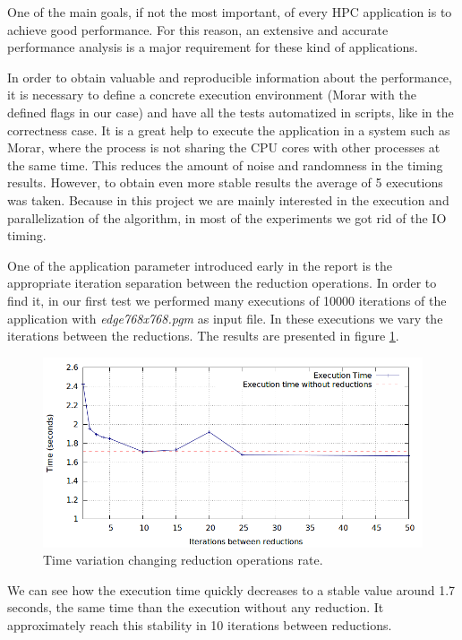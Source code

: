 \documentclass[12pt, a4paper, oneside]{article}
\begin{document}
One of the main goals, if not the most important, of every HPC application is to achieve good performance. For this reason, an extensive and accurate performance analysis is a major requirement for these kind of applications.

In order to obtain valuable and reproducible information about the performance, it is necessary to define a concrete execution environment (Morar with the defined flags in our case) and have all the tests automatized in scripts, like in the correctness case.
It is a great help to execute the application in a system such as Morar, where the process is not sharing the CPU cores with other processes at the same time. This reduces the amount of noise and randomness in the timing results.
However, to obtain even more stable results the average of 5 executions was taken.
Because in this project we are mainly interested in the execution and parallelization of the algorithm, in most of the experiments we got rid of the IO timing.

One of the application parameter introduced early in the report is the appropriate iteration separation between the reduction operations.
In order to find it, in our first test we performed many executions of 10000 iterations of the application with \emph{edge768x768.pgm} as input file.
In these executions we vary the iterations between the reductions. The results are presented in figure \ref{figure:reductions}.

\begin{figure}[htbp]
 \centering
 \includegraphics[width=\textwidth]{plots/reductions}
 \caption{Time variation changing reduction operations rate.}
 \label{figure:reductions}
\end{figure}

We can see how the execution time quickly decreases to a stable value around 1.7 seconds, the same time than the execution without any reduction. It approximately reach this stability in 10 iterations between reductions.
\end{document}
